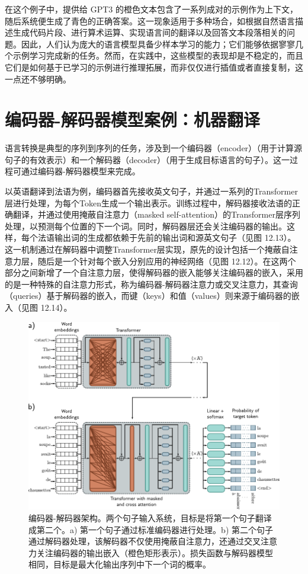 \documentclass[lang=cn,newtx,10pt,scheme=chinese]{elegantbook}
\begin{document}
在这个例子中，提供给 GPT3 的橙色文本包含了一系列成对的示例作为上下文，随后系统便生成了青色的正确答案。这一现象适用于多种场合，如根据自然语言描述生成代码片段、进行算术运算、实现语言间的翻译以及回答文本段落相关的问题。因此，人们认为庞大的语言模型具备少样本学习的能力；它们能够依据寥寥几个示例学习完成新的任务。然而，在实践中，这些模型的表现却是不稳定的，而且它们是如何基于已学习的示例进行推理拓展，而非仅仅进行插值或者直接复制，这一点还不够明确。

\section{编码器-解码器模型案例：机器翻译}
语言转换是典型的序列到序列的任务，涉及到一个编码器（encoder）（用于计算源句子的有效表示）和一个解码器（decoder）（用于生成目标语言的句子）。这一过程可通过编码器-解码器模型来完成。

以英语翻译到法语为例，编码器首先接收英文句子，并通过一系列的Transformer层进行处理，为每个Token生成一个输出表示。训练过程中，解码器接收法语的正确翻译，并通过使用掩蔽自注意力（masked self-attention）的Transformer层序列处理，以预测每个位置的下一个词。同时，解码器层还会关注编码器的输出。这样，每个法语输出词的生成都依赖于先前的输出词和源英文句子（见图 12.13）。这一机制通过在解码器中调整Transformer层实现，原先的设计包括一个掩蔽自注意力层，随后是一个针对每个嵌入分别应用的神经网络（见图 12.12）。在这两个部分之间新增了一个自注意力层，使得解码器的嵌入能够关注编码器的嵌入，采用的是一种特殊的自注意力形式，称为编码器-解码器注意力或交叉注意力，其查询（queries）基于解码器的嵌入，而键（keys）和值（values）则来源于编码器的嵌入（见图 12.14）。

\begin{figure}[ht!]
\centering
\includegraphics[width=0.7\linewidth]{PDFFigures/UDLChap12PDF/TransformerEncoderDecoder.pdf}
\caption{编码器-解码器架构。两个句子输入系统，目标是将第一个句子翻译成第二个。a) 第一个句子通过标准编码器进行处理。b) 第二个句子通过解码器处理，该解码器不仅使用掩蔽自注意力，还通过交叉注意力关注编码器的输出嵌入（橙色矩形表示）。损失函数与解码器模型相同，目标是最大化输出序列中下一个词的概率。}
\end{figure}
\end{document}
